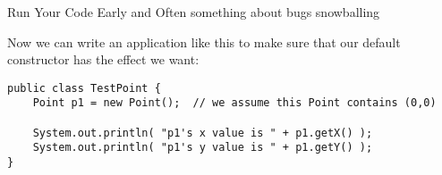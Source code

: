 \begin{tip}{Run Your Code Early and Often}
    something about bugs snowballing
\end{tip}

Now we can write an application like this to make sure that our default constructor has the effect we want:

\begin{verbatim}
public class TestPoint {
    Point p1 = new Point();  // we assume this Point contains (0,0)
    
    System.out.println( "p1's x value is " + p1.getX() );
    System.out.println( "p1's y value is " + p1.getY() );
}
\end{verbatim}
